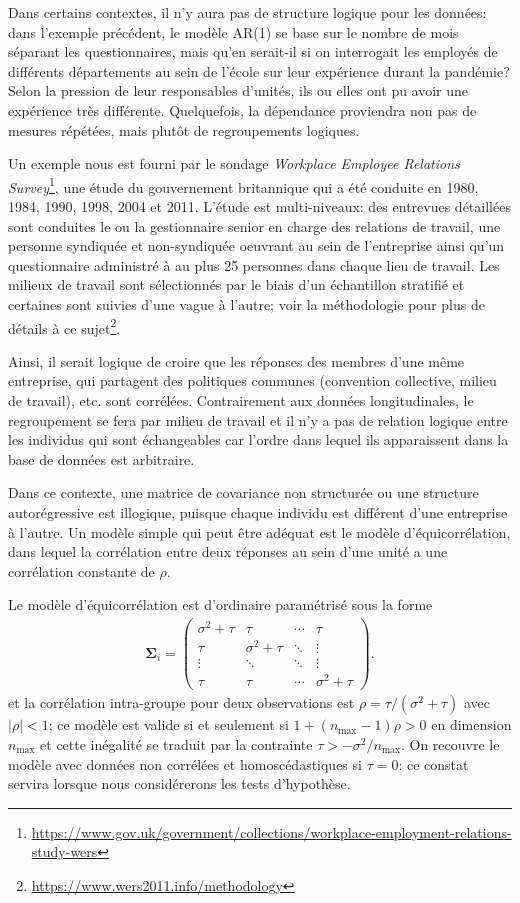 \documentclass[
  11pt,
  letterpaper,
]{article}
\renewcommand{\href}[2]{#2\footnote{\url{#1}}}
\theoremstyle{definition}
\theoremstyle{definition}
\theoremstyle{definition}
\theoremstyle{definition}
\theoremstyle{remark}
\begin{document}
Dans certains contextes, il n'y aura pas de structure logique pour les données: dans l'exemple précédent, le modèle AR(1) se base sur le nombre de mois séparant les questionnaires, mais qu'en serait-il si on interrogait les employés de différents départements au sein de l'école sur leur expérience durant la pandémie? Selon la pression de leur responsables d'unités, ils ou elles ont pu avoir une expérience très différente. Quelquefois, la dépendance proviendra non pas de mesures répétées, mais plutôt de regroupements logiques.

Un exemple nous est fourni par le sondage \href{https://www.gov.uk/government/collections/workplace-employment-relations-study-wers}{\emph{Workplace Employee Relations Survey}}, une étude du gouvernement britannique qui a été conduite en 1980, 1984, 1990, 1998, 2004 et 2011. L'étude est multi-niveaux: des entrevues détaillées sont conduites le ou la gestionnaire senior en charge des relations de travail, une personne syndiquée et non-syndiquée oeuvrant au sein de l'entreprise ainsi qu'un questionnaire administré à au plus 25 personnes dans chaque lieu de travail. Les milieux de travail sont sélectionnés par le biais d'un échantillon stratifié et certaines sont suivies d'une vague à l'autre; \href{https://www.wers2011.info/methodology}{voir la méthodologie pour plus de détails à ce sujet}.

Ainsi, il serait logique de croire que les réponses des membres d'une même entreprise, qui partagent des politiques communes (convention collective, milieu de travail), etc. sont corrélées. Contrairement aux données longitudinales, le regroupement se fera par milieu de travail et il n'y a pas de relation logique entre les individus qui sont échangeables car l'ordre dans lequel ils apparaissent dans la base de données est arbitraire.

Dans ce contexte, une matrice de covariance non structurée ou une structure autorégressive est illogique, puisque chaque individu est différent d'une entreprise à l'autre. Un modèle simple qui peut être adéquat est le modèle d'équicorrélation, dans lequel la corrélation entre deux réponses au sein d'une unité a une corrélation constante de \(\rho\).

Le modèle d'équicorrélation est d'ordinaire paramétrisé sous la forme
\begin{align*}
\boldsymbol{\Sigma}_i =
\begin{pmatrix}
  \sigma^2+\tau & \tau &\cdots  & \tau\\
  \tau & \sigma^2+\tau &\ddots& \vdots\\
  \vdots & \ddots & \ddots & \vdots \\
    \tau & \tau & \cdots &\sigma^2+\tau
\end{pmatrix}.
\end{align*}
et la corrélation intra-groupe pour deux observations est \(\rho=\tau/(\sigma^2+\tau)\) avec \(|\rho| < 1\); ce modèle est valide si et seulement si \(1+(n_{\max}-1)\rho > 0\) en dimension \(n_{\max}\) et cette inégalité se traduit par la contrainte \(\tau > -\sigma^2/n_{\max}\). On recouvre le modèle avec données non corrélées et homoscédastiques si \(\tau=0\): ce constat servira lorsque nous considérerons les tests d'hypothèse.
\end{document}

